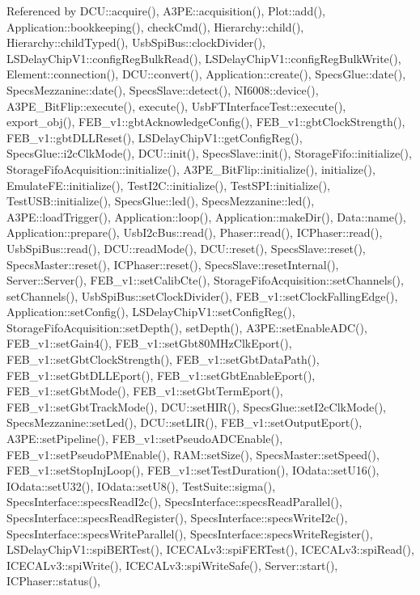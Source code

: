 Referenced by D\+C\+U\+::acquire(), A3\+P\+E\+::acquisition(), Plot\+::add(), Application\+::bookkeeping(), check\+Cmd(), Hierarchy\+::child(), Hierarchy\+::child\+Typed(), Usb\+Spi\+Bus\+::clock\+Divider(), L\+S\+Delay\+Chip\+V1\+::config\+Reg\+Bulk\+Read(), L\+S\+Delay\+Chip\+V1\+::config\+Reg\+Bulk\+Write(), Element\+::connection(), D\+C\+U\+::convert(), Application\+::create(), Specs\+Glue\+::date(), Specs\+Mezzanine\+::date(), Specs\+Slave\+::detect(), N\+I6008\+::device(), A3\+P\+E\+\_\+\+Bit\+Flip\+::execute(), execute(), Usb\+F\+T\+Interface\+Test\+::execute(), export\+\_\+obj(), F\+E\+B\+\_\+v1\+::gbt\+Acknowledge\+Config(), F\+E\+B\+\_\+v1\+::gbt\+Clock\+Strength(), F\+E\+B\+\_\+v1\+::gbt\+D\+L\+L\+Reset(), L\+S\+Delay\+Chip\+V1\+::get\+Config\+Reg(), Specs\+Glue\+::i2c\+Clk\+Mode(), D\+C\+U\+::init(), Specs\+Slave\+::init(), Storage\+Fifo\+::initialize(), Storage\+Fifo\+Acquisition\+::initialize(), A3\+P\+E\+\_\+\+Bit\+Flip\+::initialize(), initialize(), Emulate\+F\+E\+::initialize(), Test\+I2\+C\+::initialize(), Test\+S\+P\+I\+::initialize(), Test\+U\+S\+B\+::initialize(), Specs\+Glue\+::led(), Specs\+Mezzanine\+::led(), A3\+P\+E\+::load\+Trigger(), Application\+::loop(), Application\+::make\+Dir(), Data\+::name(), Application\+::prepare(), Usb\+I2c\+Bus\+::read(), Phaser\+::read(), I\+C\+Phaser\+::read(), Usb\+Spi\+Bus\+::read(), D\+C\+U\+::read\+Mode(), D\+C\+U\+::reset(), Specs\+Slave\+::reset(), Specs\+Master\+::reset(), I\+C\+Phaser\+::reset(), Specs\+Slave\+::reset\+Internal(), Server\+::\+Server(), F\+E\+B\+\_\+v1\+::set\+Calib\+Cte(), Storage\+Fifo\+Acquisition\+::set\+Channels(), set\+Channels(), Usb\+Spi\+Bus\+::set\+Clock\+Divider(), F\+E\+B\+\_\+v1\+::set\+Clock\+Falling\+Edge(), Application\+::set\+Config(), L\+S\+Delay\+Chip\+V1\+::set\+Config\+Reg(), Storage\+Fifo\+Acquisition\+::set\+Depth(), set\+Depth(), A3\+P\+E\+::set\+Enable\+A\+D\+C(), F\+E\+B\+\_\+v1\+::set\+Gain4(), F\+E\+B\+\_\+v1\+::set\+Gbt80\+M\+Hz\+Clk\+Eport(), F\+E\+B\+\_\+v1\+::set\+Gbt\+Clock\+Strength(), F\+E\+B\+\_\+v1\+::set\+Gbt\+Data\+Path(), F\+E\+B\+\_\+v1\+::set\+Gbt\+D\+L\+L\+Eport(), F\+E\+B\+\_\+v1\+::set\+Gbt\+Enable\+Eport(), F\+E\+B\+\_\+v1\+::set\+Gbt\+Mode(), F\+E\+B\+\_\+v1\+::set\+Gbt\+Term\+Eport(), F\+E\+B\+\_\+v1\+::set\+Gbt\+Track\+Mode(), D\+C\+U\+::set\+H\+I\+R(), Specs\+Glue\+::set\+I2c\+Clk\+Mode(), Specs\+Mezzanine\+::set\+Led(), D\+C\+U\+::set\+L\+I\+R(), F\+E\+B\+\_\+v1\+::set\+Output\+Eport(), A3\+P\+E\+::set\+Pipeline(), F\+E\+B\+\_\+v1\+::set\+Pseudo\+A\+D\+C\+Enable(), F\+E\+B\+\_\+v1\+::set\+Pseudo\+P\+M\+Enable(), R\+A\+M\+::set\+Size(), Specs\+Master\+::set\+Speed(), F\+E\+B\+\_\+v1\+::set\+Stop\+Inj\+Loop(), F\+E\+B\+\_\+v1\+::set\+Test\+Duration(), I\+Odata\+::set\+U16(), I\+Odata\+::set\+U32(), I\+Odata\+::set\+U8(), Test\+Suite\+::sigma(), Specs\+Interface\+::specs\+Read\+I2c(), Specs\+Interface\+::specs\+Read\+Parallel(), Specs\+Interface\+::specs\+Read\+Register(), Specs\+Interface\+::specs\+Write\+I2c(), Specs\+Interface\+::specs\+Write\+Parallel(), Specs\+Interface\+::specs\+Write\+Register(), L\+S\+Delay\+Chip\+V1\+::spi\+B\+E\+R\+Test(), I\+C\+E\+C\+A\+Lv3\+::spi\+F\+E\+R\+Test(), I\+C\+E\+C\+A\+Lv3\+::spi\+Read(), I\+C\+E\+C\+A\+Lv3\+::spi\+Write(), I\+C\+E\+C\+A\+Lv3\+::spi\+Write\+Safe(), Server\+::start(), I\+C\+Phaser\+::status(), 